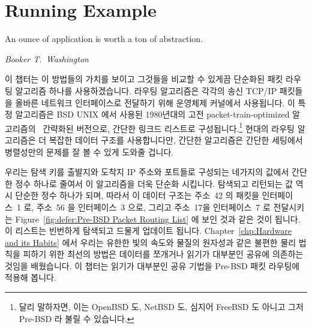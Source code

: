 \fi

\section{Running Example}
\label{sec:defer:Running Example}
%
\epigraph{An ounce of application is worth a ton of abstraction.}
	 {\emph{Booker T.~Washington}}

이 챕터는 이 방법들의 가치를 보이고 그것들을 비교할 수 있게끔 단순화된 패킷
라우팅 알고리즘 하나를 사용하겠습니다.
라우팅 알고리즘은 각각의 송신 TCP/IP 패킷들을 올바른 네트워크 인터페이스로
전달하기 위해 운영체제 커널에서 사용됩니다.
이 특정 알고리즘은 BSD UNIX 에서 사용된 1980년대의 고전 packet-train-optimized
알고리즘의~\cite{VanJacobson88} 간략화된 버전으로, 간단한 링크드 리스트로
구성됩니다.\footnote{
	달리 말하자면, 이는 OpenBSD 도, NetBSD 도, 심지어 FreeBSD 도 아니고
	그저 Pre-BSD 라 불릴 수 있습니다.}
현대의 라우팅 알고리즘은 더 복잡한 데이터 구조를 사용합니다만, 간단한
알고리즘은 간단한 세팅에서 병렬성만의 문제를 잘 볼 수 있게 도와줄 겁니다.

우리는 탐색 키를 출발지와 도착지 IP 주소와 포트들로 구성되는 네가지의 값에서
간단한 정수 하나로 줄여서 이 알고리즘을 더욱 단순화 시킵니다.
탐색되고 리턴되는 값 역시 단순한 정수 하나가 되며, 따라서 이 데이터 구조는
주소~42 의 패킷을 인터페이스~1 로, 주소~56 을 인터페이스~3 으로, 그리고
주소~17을 인터페이스~7 로 전달시키는
Figure~\ref{fig:defer:Pre-BSD Packet Routing List} 에 보인 것과 같은 것이
됩니다.
이 리스트는 빈번하게 탐색되고 드물게 업데이트 됩니다.
Chapter~\ref{chp:Hardware and its Habits} 에서 우리는 유한한 빛의 속도와 물질의
원자성과 같은 불편한 물리 법칙을 피하기 위한 최선의 방법은 데이터를 쪼개거나
읽기가 대부분인 공유에 의존하는 것임을 배웠습니다.
이 챕터는 읽기가 대부분인 공유 기법을 Pre-BSD 패킷 라우팅에 적용해 봅니다.

